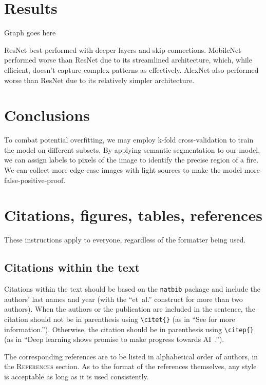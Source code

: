 \section{Results}

Graph goes here

ResNet best-performed with deeper layers and skip connections.
MobileNet performed worse than ResNet due to its streamlined architecture, which, while efficient, doesn’t capture complex patterns as effectively. AlexNet also performed worse than ResNet due to its relatively simpler architecture.


\section{Conclusions}

To combat potential overfitting, we may employ k-fold cross-validation to train the model on different subsets.
By applying semantic segmentation to our model, we can assign labels to pixels of the image to identify the precise region of a fire.
We can collect more edge case images with light sources to make the model more false-positive-proof.


\section{Citations, figures, tables, references}
\label{others}

These instructions apply to everyone, regardless of the formatter being used.

\subsection{Citations within the text}

Citations within the text should be based on the \texttt{natbib} package
and include the authors' last names and year (with the ``et~al.'' construct
for more than two authors). When the authors or the publication are
included in the sentence, the citation should not be in parenthesis using \verb|\citet{}| (as
in ``See \citet{Hinton06} for more information.''). Otherwise, the citation
should be in parenthesis using \verb|\citep{}| (as in ``Deep learning shows promise to make progress
towards AI~\citep{Bengio+chapter2007}.'').

The corresponding references are to be listed in alphabetical order of
authors, in the \textsc{References} section. As to the format of the
references themselves, any style is acceptable as long as it is used
consistently.

